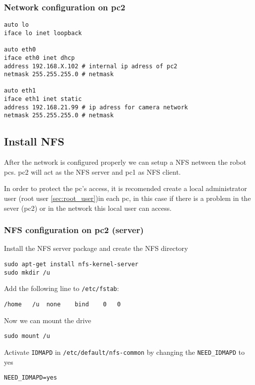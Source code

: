 \subsubsection{Network configuration on pc2}

\begin{lstlisting} 
auto lo
iface lo inet loopback

auto eth0
iface eth0 inet dhcp
address 192.168.X.102 # internal ip adress of pc2
netmask 255.255.255.0 # netmask

auto eth1
iface eth1 inet static
address 192.168.21.99 # ip adress for camera network
netmask 255.255.255.0 # netmask
\end{lstlisting}

\subsection{Install NFS}
After the network is configured properly we can setup a NFS netween the robot pcs. pc2 will act as the NFS server and pc1 as NFS client.

In order to protect the pc's access, it is recomended create a local administrator user (root user \ref{sec:root_user})in each pc, in this case if there is a problem in the sever (pc2) or in the network this local user can access.

\subsubsection{NFS configuration on pc2 (server)}
Install the NFS server package and create the NFS directory

\begin{lstlisting}
sudo apt-get install nfs-kernel-server
sudo mkdir /u 
\end{lstlisting}

Add the following line to \texttt{/etc/fstab}:

\begin{lstlisting}
/home	/u	none	bind	0	0
\end{lstlisting}

Now we can mount the drive

\begin{lstlisting}
sudo mount /u
\end{lstlisting}

Activate \texttt{IDMAPD} in \texttt{/etc/default/nfs-common} by changing the \texttt{NEED\_IDMAPD} to yes

\begin{lstlisting}
NEED_IDMAPD=yes
\end{lstlisting}


